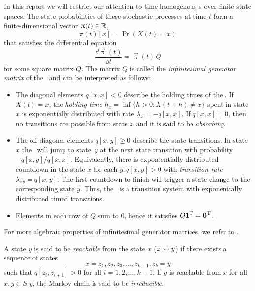 In this report we will restrict our attention to time-homogenous \CTMC
s over finite state spaces. The state probabilities of these
stochastic processes at time $t$ form a finite-dimensional vector
$\bm{\mathrm{\uppi}}(t) \in \mathbb{R}$,
\begin{equation}
  \pi(t)[x] = \Pr(X(t) = x)
\end{equation}
that satisfies the differential equation
\begin{equation}
  \label{eq:background:ctmc:diffeq}
  \frac{\dd \vec{\uppi}(t)}{\dd t} = \vec{\uppi}(t) \, Q
\end{equation}
for some square matrix $Q$. The matrix $Q$ is called the
\emph{infinitesimal generator matrix} of the \CTMC\ and can be
interpreted as follows:
\begin{itemize}
\item The diagonal elements $q[x, x] < 0$ describe the holding times
  of the \CTMC. If $X(t) = x$, the \emph{holding time}
  $h_x = \inf \{ h > 0 : X(t + h) \ne x \}$ spent in state $x$ is
  exponentially distributed with rate $\lambda_x = -q[x, x]$. If
  $q[x, x] = 0$, then no transitions are possible from state $x$ and
  it is said to be \emph{absorbing}.
\item The off-diagonal elements $q[x, y] \ge 0$ describe the state
  transitions. In state~$x$ the \CTMC\ will jump to state~$y$ at the
  next state transition with probability $-q[x, y] / q[x, x]$.
  Equivalently, there is expontentially distributed countdown in the
  state $x$ for each $y : q[x, y] > 0$ with \emph{transition rate}
  $\lambda_{xy} = q[x, y]$. The first countdown to finish will trigger
  a state change to the corresponding state $y$. Thus, the \CTMC\ is a
  transition system with exponentially distributed timed transitions.
\item Elements in each row of $Q$ sum to $0$, hence it satisfies
  $Q \bm{\mathrm{1}}^{\mathrm{T}} = \bm{\mathrm{0}}^{\mathrm{T}}$.
\end{itemize}

For more algebraic properties of infinitesimal generator matrices, we
refer to \citet{plemmons1979nonnegative,stewart1994introduction}.

A state $y$ is said to be \emph{reachable} from the state $x$
($x \leadsto y$) if there exists a sequence of states
\begin{equation}
  x = z_1, z_2, z_3, \ldots, z_{k - 1}, z_k = y
\end{equation}
such that $q[z_i, z_{i + 1}] > 0$ for all $i = 1, 2, \ldots, k -
1$.
If $y$ is reachable from $x$ for all $x, y \in S$ $y$, the Markov chain
is said to be \emph{irreducible}.

